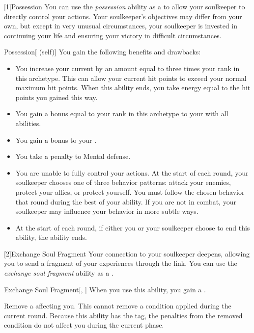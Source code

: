         [1]{Possession} You can use the \textit{possession} ability as a  to allow your soulkeeper to directly control your actions.
        Your soulkeeper's objectives may differ from your own, but except in very unusual circumstances, your soulkeeper is invested in continuing your life and ensuring your victory in difficult circumstances.
        \begin{attuneability}{Possession}[ (self)]
            You gain the following benefits and drawbacks:
            \begin{itemize}
                \item You increase your current  by an amount equal to three times your rank in this archetype.
                    This can allow your current hit points to exceed your normal maximum hit points.
                    When this ability ends, you take energy  equal to the hit points you gained this way.
                \item You gain a bonus equal to your rank in this archetype to your  with all abilities.
                \item You gain a  bonus to your .
                \item You take a  penalty to Mental defense.
                \item You are unable to fully control your actions.
                    At the start of each round, your soulkeeper chooses one of three behavior patterns: attack your enemies, protect your allies, or protect yourself.
                    You must follow the chosen behavior that round during the best of your ability.
                    If you are not in combat, your soulkeeper may influence your behavior in more subtle ways.
                \item At the start of each round, if either you or your soulkeeper choose to end this ability, the ability ends.
            \end{itemize}
        \end{attuneability}

        [2]{Exchange Soul Fragment} Your connection to your soulkeeper deepens, allowing you to send a fragment of your experiences through the link.
        You can use the \textit{exchange soul fragment} ability as a .
        \begin{freeability}{Exchange Soul Fragment}[, ]
            When you use this ability, you gain a .

            Remove a  affecting you.
            This cannot remove a condition applied during the current round.
            Because this ability has the  tag, the penalties from the removed condition do not affect you during the current phase.
        \end{freeability}

